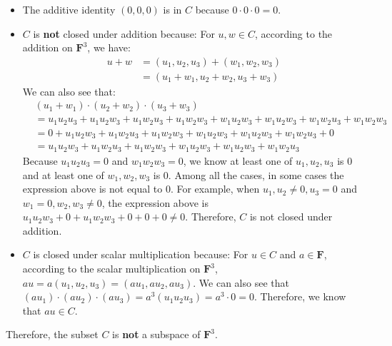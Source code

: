 \documentclass[12pt, letterpaper, oneside]{book}
\begin{document}
\begin{itemize}
  \item The additive identity $(0, 0, 0)$ is in $C$ because $0 \cdot 0 \cdot 0
    = 0$.
  \item $C$ is \textbf{not} closed under addition because: For $u, w \in C$,
    according to the addition on $\mathbf{F}^3$, we have:
    \begin{equation*}
      \begin{split}
        u + w
        & = (u_1, u_2, u_3) + (w_1, w_2, w_3) \\
        & = (u_1 + w_1, u_2 + w_2, u_3 + w_3)
      \end{split}
    \end{equation*}
    We can also see that:
    \begin{equation*}
      \begin{split}
        & (u_1 + w_1) \cdot (u_2 + w_2) \cdot (u_3 + w_3) \\
        & = u_1 u_2 u_3 + u_1 u_2 w_3 + u_1 w_2 u_3 + u_1 w_2 w_3 +
          w_1 u_2 w_3 + w_1 u_2 w_3 + w_1 w_2 u_3 + w_1 w_2 w_3 \\
        & = 0 + u_1 u_2 w_3 + u_1 w_2 u_3 + u_1 w_2 w_3 + w_1 u_2 w_3 +
          w_1 u_2 w_3 + w_1 w_2 u_3 + 0 \\
        & = u_1 u_2 w_3 + u_1 w_2 u_3 + u_1 w_2 w_3 + w_1 u_2 w_3 + w_1 u_2 w_3
          + w_1 w_2 u_3
      \end{split}
    \end{equation*}
    Because $u_1 u_2 u_3 = 0$ and $w_1 w_2 w_3 = 0$, we know at least one of
    $u_1, u_2, u_3$ is 0 and at least one of $w_1, w_2, w_3$ is 0. Among all
    the cases, in some cases the expression above is not equal to 0. For
    example, when $u_1, u_2 \neq 0, u_3 = 0$ and $w_1 = 0, w_2, w_3 \neq 0$,
    the expression above is $u_1 u_2 w_3 + 0 + u_1 w_2 w_3 + 0 + 0 + 0 \neq 0$.
    Therefore, $C$ is not closed under addition.
  \item $C$ is closed under scalar multiplication because: For $u \in C$ and
    $a \in \mathbf{F}$, according to the scalar multiplication on
    $\mathbf{F}^3$, $au = a(u_1, u_2, u_3) = (a u_1, a u_2, a u_3)$. We can
    also see that $(a u_1) \cdot (a u_2) \cdot (a u_3) = a^3(u_1 u_2 u_3) =
    a^3 \cdot 0 = 0$. Therefore, we know that $au \in C$.
\end{itemize}

Therefore, the subset $C$ is \textbf{not} a subspace of $\mathbf{F}^3$.

\end{document}
